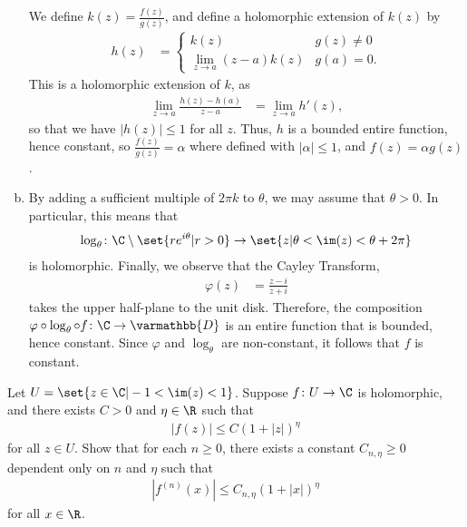 \documentclass[10pt]{mypackage}
\renewcommand*{\mathbb}[1]{\varmathbb{#1}}
\begin{document}
\begin{solution}
\begin{enumerate}[(a)]
      We define $k(z) = \frac{f(z)}{g(z)}$, and define a holomorphic extension of $k(z)$ by
      \begin{align*}
        h(z) &= \begin{cases}
          k(z) & g(z)\neq 0\\
          \lim_{z\rightarrow a} \left( z-a \right) k(z) & g(a) = 0.
        \end{cases}
      \end{align*}
      This is a holomorphic extension of $k$, as
      \begin{align*}
        \lim_{z\rightarrow a} \frac{h(z)-h(a)}{z-a} &= \lim_{z\rightarrow a} h'(z),
      \end{align*}
      so that we have $\left\vert h(z) \right\vert \leq 1$ for all $z$. Thus, $h$ is a bounded entire function, hence constant, so $ \frac{f(z)}{g(z)} = \alpha $ where defined with $\left\vert \alpha \right\vert \leq 1$, and $f(z) = \alpha g(z)$.
    \item By adding a sufficient multiple of $2\pi k$ to $\theta$, we may assume that $\theta > 0$. In particular, this means that 
      \begin{align*}
        \log_{\theta}\colon \C\setminus \set{re^{i\theta} | r > 0} \rightarrow \set{z | \theta < \im(z) < \theta + 2\pi}
      \end{align*}
      is holomorphic. Finally, we observe that the Cayley Transform,
      \begin{align*}
        \varphi(z) &= \frac{z-i}{z+i}
      \end{align*}
      takes the upper half-plane to the unit disk. Therefore, the composition $\varphi\circ \log_{\theta} \circ f\colon \C\rightarrow \mathbb{D}$ is an entire function that is bounded, hence constant. Since $\varphi$ and $\log_{\theta}$ are non-constant, it follows that $f$ is constant.
  \end{enumerate}
\end{solution}
\begin{problem}[Problem 4]
  Let $U = \set{z\in \C | -1 < \im(z) < 1}$. Suppose $f\colon U\rightarrow \C$ is holomorphic, and there exists $C > 0$ and $ \eta\in \R $ such that
  \begin{align*}
    \left\vert f(z) \right\vert \leq C\left( 1 + \left\vert z \right\vert \right)^{\eta}
  \end{align*}
  for all $z\in U$. Show that for each $n \geq 0$, there exists a constant $ C_{n,\eta} \geq 0 $ dependent only on $n$ and $\eta$ such that
  \begin{align*}
    \left\vert f^{(n)}(x) \right\vert \leq C_{n,\eta} \left( 1 + \left\vert x \right\vert \right)^{\eta}
  \end{align*}
  for all $x\in \R$.
\end{problem}
\end{document}
